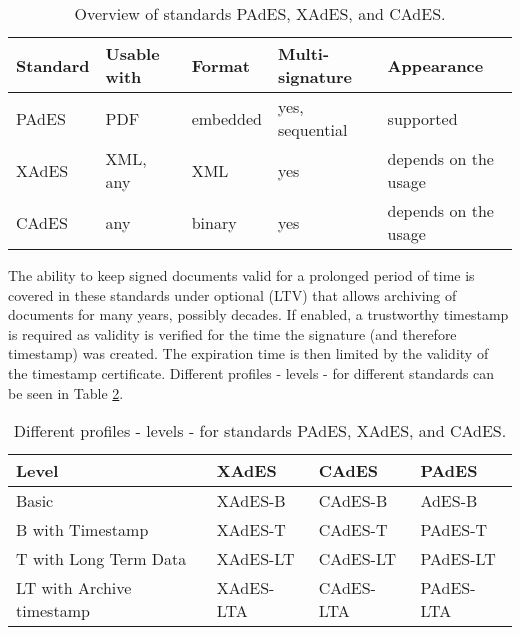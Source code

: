 \documentclass[thesismargins, english, thesislinespacing, onelinechapterstyle, upjsfrontpage]{rnthesis}
\begin{document}
\begin{table}[!ht]
  \begin{tabular}{ |p{2cm}||p{2.2cm}|p{2cm}|p{3cm}|p{3.9cm}| }
    \hline
    Standard & Usable with & Format & Multi-signature & Appearance \\
    \hline
    PAdES & PDF                  & embedded         & yes, sequential    & supported            \\
    XAdES & XML, any             & XML              & yes                & depends on the usage \\
    CAdES & any                  & binary           & yes                & depends on the usage \\
    \hline
  \end{tabular}

  \caption{Overview of standards PAdES, XAdES, and CAdES.}
  \label{table:1}
\end{table}

The ability to keep signed documents valid for a prolonged period of time is covered in these standards under optional  (LTV) that allows archiving of documents for many years, possibly decades.
If enabled, a trustworthy timestamp is required as validity is verified for the time the signature (and therefore timestamp) was created.
The expiration time is then limited by the validity of the timestamp certificate.
Different profiles - levels - for different standards can be seen in Table \ref{table:2}.

\begin{table}[!ht]
  \centering
  \begin{tabular}{|l||l|l|l|}
    \hline
    Level                     & XAdES     & CAdES     & PAdES     \\
    \hline
    Basic                     & XAdES-B   & CAdES-B   & AdES-B    \\
    B with Timestamp          & XAdES-T   & CAdES-T   & PAdES-T   \\
    T with Long Term Data     & XAdES-LT  & CAdES-LT  & PAdES-LT  \\
    LT with Archive timestamp & XAdES-LTA & CAdES-LTA & PAdES-LTA \\
    \hline
  \end{tabular}

  \caption{Different profiles - levels - for standards PAdES, XAdES, and CAdES.}
  \label{table:2}
\end{table}

\iffalse %
\end{document}

